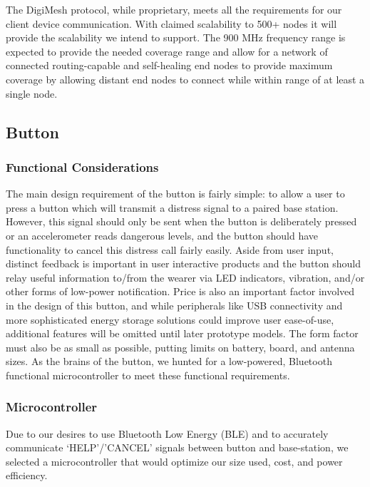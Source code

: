 \documentclass[journal,compsoc]{IEEEtran}
\begin{document}
The DigiMesh protocol, while proprietary, meets all the requirements for our client device communication.  With claimed scalability to 500+ nodes it will provide the scalability we intend to support.  The 900 MHz frequency range is expected to provide the needed coverage range and allow for a network of connected routing-capable and self-healing end nodes to provide maximum coverage  by allowing distant end nodes to connect while within range of at least a single node.

\subsection{Button}

\subsubsection{Functional Considerations}

The main design requirement of the button is fairly simple: to allow a user to press a button which will transmit a distress signal to a paired base station.  However, this signal should only be sent when the button is deliberately pressed or an accelerometer reads dangerous levels, and the button should have functionality to cancel this distress call fairly easily.  Aside from user input, distinct feedback is important in user interactive products and the button should relay useful information to/from the wearer via LED indicators, vibration, and/or other forms of low-power notification.  Price is also an important factor involved in the design of this button, and while peripherals like USB connectivity and more sophisticated energy storage solutions could improve user ease-of-use, additional features will be omitted until later prototype models.  The form factor must also be as small as possible, putting limits on battery, board, and antenna sizes.  As the brains of the button, we hunted for a low-powered, Bluetooth functional microcontroller to meet these functional requirements.

\subsubsection{Microcontroller}

Due to our desires to use Bluetooth Low Energy (BLE) and to accurately communicate ‘HELP’/’CANCEL’ signals between button and base-station, we selected a microcontroller that would optimize our size used, cost, and power efficiency.
\end{document}
